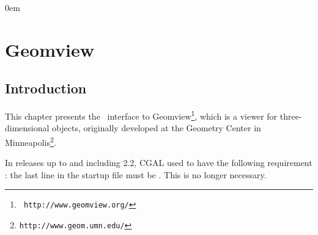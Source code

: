 \newcommand{\Section}[1]{Section~{\protect\ref{#1}}}
\newcommand{\Chapter}[1]{Chapter~{\protect\ref{#1}}}
\newcommand{\new}[1]{\marginpar{\sf #1}}

\newcommand{\what}{\mbox{?\hspace*{2cm}?}}


\parindent0em
\setlength{\parskip}{1ex minus 0.9ex}
\sloppy

\newcommand{\note}[1]{{\bf NOTE: #1}}

\chapter{Geomview} \label{ChapterGeomview}


\section{Introduction}

This chapter presents the \cgal\ interface to Geomview\footnote{\tt
http://www.geomview.org/}, which is a
viewer for three-dimensional objects, originally developed at the Geometry
Center in Minneapolis\footnote{\tt http://www.geom.umn.edu/}.

 In releases up to and including 2.2, CGAL used to have
the following requirement : the last line in the startup file 
must be .  This is no longer necessary.

